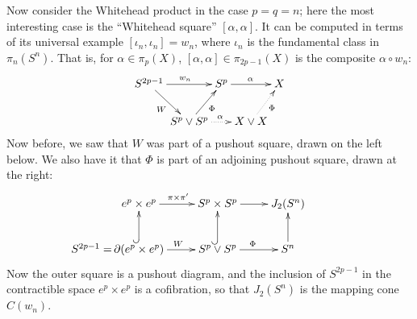 \documentclass{article}
\theoremstyle{definition}
\begin{document}
Now consider the Whitehead product in the case $p = q = n$; here the most interesting case is the ``Whitehead square'' $[\alpha, \alpha]$.  It can be computed in terms of its universal example $[\iota_n, \iota_n] = w_n$, where $\iota_n$ is the fundamental class in $\pi_n (S^n)$. That is, for $\alpha\in\pi_p(X)$, $[\alpha,\alpha]\in\pi_{2p-1}(X)$ is the composite $\alpha \circ w_n$:
\[\xymatrix@R=.7cm@C=0cm
{S^{2p-1}\ar[rr]^{w_n}\ar[dr]_{W}&&S^p\ar[rr]^\alpha&&X\\
&S^p\vee S^p\ar[ur]_{\Phi}\ar@{..>}[rr]^\alpha&&X\vee X\ar@{..>}[ur]_{\Phi}
}\]
Now before, we saw that $W$ was part of a pushout square, drawn on the left below. We also have it that $\Phi$ is part of an adjoining pushout square, drawn at the right:
\[\xymatrix{
e^p\times e^p\ar[r]^{\pi\times\pi'}&S^p\times S^p\ar[r]&J_2(S^n)\\
\makebox[0cm][r]{$S^{2p-1}=$\,}
\partial(e^p\times e^p)\ar@{^{(}->}[u]\ar[r]^W&S^p\vee S^p\ar@{^{(}->}[u]\ar[r]^\Phi &S^n\ar[u]
}\]
Now the outer square is a pushout diagram, and the inclusion of $S^{2p-1}$ in the contractible space $e^p\times e^p$ is a cofibration, so that $J_2(S^n)$ is the mapping cone $C(w_n)$.
\end{document}
